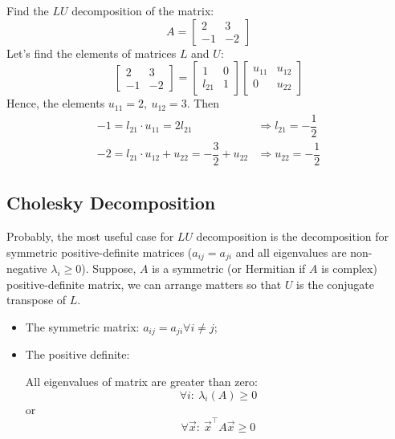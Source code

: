 \Ex Find the $LU$ decomposition of the matrix:
\[
    A = \begin{bmatrix}
        2 & 3\\
        -1 & -2
    \end{bmatrix}    
\]
Let's find the elements of matrices $L$ and $U$:
\[
    \begin{bmatrix}
        2 & 3\\
        -1 & -2
    \end{bmatrix} = \begin{bmatrix}
        1 & 0\\
        l_{21} & 1
    \end{bmatrix}  \begin{bmatrix}
        u_{11} & u_{12}\\
        0 & u_{22}
    \end{bmatrix} 
\]
Hence, the elements $u_{11} = 2, \ u_{12} = 3$. Then
\[
    \begin{array}{lr}
        -1 = l_{21} \cdot u_{11} = 2l_{21} & \Longrightarrow l_{21} = -\dfrac{1}{2} \\[0.5cm]
        -2 = l_{21} \cdot u_{12} + u_{22} = -\dfrac{3}{2} + u_{22} & \Longrightarrow u_{22} = -\dfrac{1}{2}
        
    \end{array}
\]

\subsection*{Cholesky Decomposition}
Probably, the most useful case for $LU$ decomposition is the decomposition for symmetric positive-definite matrices ($a_{ij} = a_{ji}$ and all eigenvalues are non-negative $\lambda_i \geq 0$). Suppose, $A$ is a symmetric (or Hermitian if $A$ is complex) positive-definite matrix, we can arrange matters so that $U$ is the conjugate transpose of $L$.

\begin{note}{}{}
    \begin{itemize}
        \item The symmetric matrix: $a_{ij} = a_{ji} \forall i\neq j$;
        \item The positive definite:
        \par 
        All eigenvalues of matrix are greater than zero:
        \[
            \forall i: \ \lambda_i(A) \geq 0    
        \]
        or
        \[
            \forall \vec{x}:\ \vec{x}^\intercal A \vec{x} \geq 0  
        \]
    \end{itemize}
\end{note}


